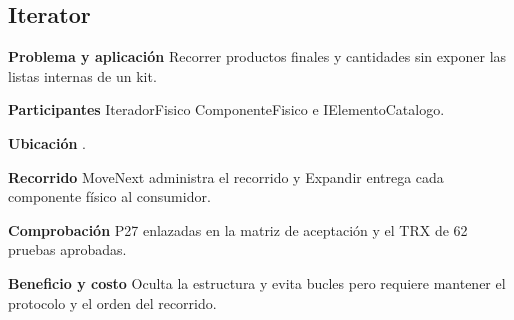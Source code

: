 \noindent\begin{minipage}{\linewidth}
\subsection{Iterator}
\textbf{Problema y aplicación} Recorrer productos finales y cantidades sin exponer las listas internas de un kit.

\textbf{Participantes} IteradorFisico ComponenteFisico e IElementoCatalogo.

\textbf{Ubicación} \href{https://github.com/Alan77-bot/LogiMarket360Alan/blob/68bda51063441415524ede51bdf61649ee9b4973/LogiMarket.Domain/Catalogo/IteradorFisico.cs#L20}{}.

\textbf{Recorrido} MoveNext administra el recorrido y Expandir entrega cada componente físico al consumidor.


\textbf{Comprobación} P27 enlazadas en la matriz de aceptación y el TRX de 62 pruebas aprobadas.

\textbf{Beneficio y costo} Oculta la estructura y evita bucles pero requiere mantener el protocolo y el orden del recorrido.

\end{minipage}\par\smallskip
